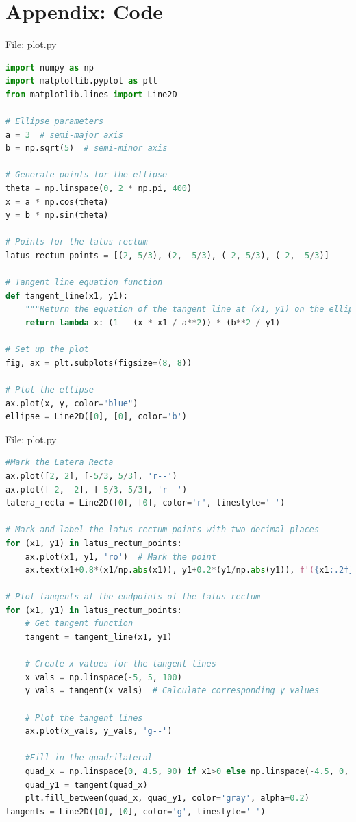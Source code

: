 \documentclass{beamer}
\numberwithin{equation}{section}
\theoremstyle{remark}
\begin{document}
\section*{Appendix: Code}
\begin{frame}[fragile]{File: plot.py}
\begin{lstlisting}[language=Python]
import numpy as np
import matplotlib.pyplot as plt
from matplotlib.lines import Line2D

# Ellipse parameters
a = 3  # semi-major axis
b = np.sqrt(5)  # semi-minor axis

# Generate points for the ellipse
theta = np.linspace(0, 2 * np.pi, 400)
x = a * np.cos(theta)
y = b * np.sin(theta)

# Points for the latus rectum
latus_rectum_points = [(2, 5/3), (2, -5/3), (-2, 5/3), (-2, -5/3)]

# Tangent line equation function
def tangent_line(x1, y1):
    """Return the equation of the tangent line at (x1, y1) on the ellipse."""
    return lambda x: (1 - (x * x1 / a**2)) * (b**2 / y1)

# Set up the plot
fig, ax = plt.subplots(figsize=(8, 8))

# Plot the ellipse
ax.plot(x, y, color="blue")
ellipse = Line2D([0], [0], color='b')
\end{lstlisting}
\end{frame}

\begin{frame}[fragile]{File: plot.py}
\begin{lstlisting}[language=Python]
#Mark the Latera Recta
ax.plot([2, 2], [-5/3, 5/3], 'r--')
ax.plot([-2, -2], [-5/3, 5/3], 'r--')
latera_recta = Line2D([0], [0], color='r', linestyle='-')

# Mark and label the latus rectum points with two decimal places
for (x1, y1) in latus_rectum_points:
    ax.plot(x1, y1, 'ro')  # Mark the point
    ax.text(x1+0.8*(x1/np.abs(x1)), y1+0.2*(y1/np.abs(y1)), f'({x1:.2f}, {y1:.2f})', fontsize=12, ha='center', va='center')

# Plot tangents at the endpoints of the latus rectum
for (x1, y1) in latus_rectum_points:
    # Get tangent function
    tangent = tangent_line(x1, y1)
    
    # Create x values for the tangent lines
    x_vals = np.linspace(-5, 5, 100)
    y_vals = tangent(x_vals)  # Calculate corresponding y values
    
    # Plot the tangent lines
    ax.plot(x_vals, y_vals, 'g--')
    
    #Fill in the quadrilateral
    quad_x = np.linspace(0, 4.5, 90) if x1>0 else np.linspace(-4.5, 0, 90)
    quad_y1 = tangent(quad_x)
    plt.fill_between(quad_x, quad_y1, color='gray', alpha=0.2)
tangents = Line2D([0], [0], color='g', linestyle='-')
\end{lstlisting}
\end{frame}
\end{document}
